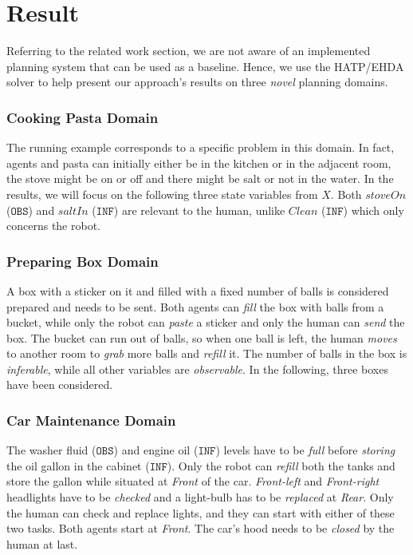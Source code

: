 \section{Result}

Referring to the related work section, we are not aware of an implemented planning system that can be used as a baseline. Hence, we use the HATP/EHDA solver to help present our approach's results on three \textit{novel} planning domains.

\subsubsection{Cooking Pasta Domain}
The running example corresponds to a specific problem in this domain. In fact, agents and pasta can initially either be in the kitchen or in the adjacent room, the stove might be on or off and there might be salt or not in the water.  
In the results, we will focus on the following three state variables from $X$. Both $stoveOn$ ($\texttt{OBS}$) and $saltIn$ ($\texttt{INF}$) are relevant to the human, unlike $Clean$ ($\texttt{INF}$) which only concerns the robot. 

\subsubsection{Preparing Box Domain}
A box with a sticker on it and filled with a fixed number of balls is considered prepared and needs to be sent. Both agents can \textit{fill} the box with balls from a bucket, while only the robot can \textit{paste} a sticker and only the human can \textit{send} the box. The bucket can run out of balls, so when one ball is left, the human \textit{moves} to another room to \textit{grab} more balls and \textit{refill} it. 
The number of balls in the box is \textit{inferable}, while all other variables are {\em observable}. 
In the following, three boxes have been considered.

\subsubsection{Car Maintenance Domain}
The washer fluid ($\texttt{OBS}$) and engine oil ($\texttt{INF}$) levels have to be \textit{full} before \textit{storing} the oil gallon in the cabinet ($\texttt{INF}$). 
Only the robot can \textit{refill} both the tanks and store the gallon while situated at \textit{Front} of the car. 
\textit{Front-left} and \textit{Front-right} headlights have to be \textit{checked} and a light-bulb has to be \textit{replaced} at \textit{Rear}. 
Only the human can check and replace lights, and they can start with either of these two tasks.
Both agents start at \textit{Front}.
The car's hood needs to be \textit{closed} by the human at last.


